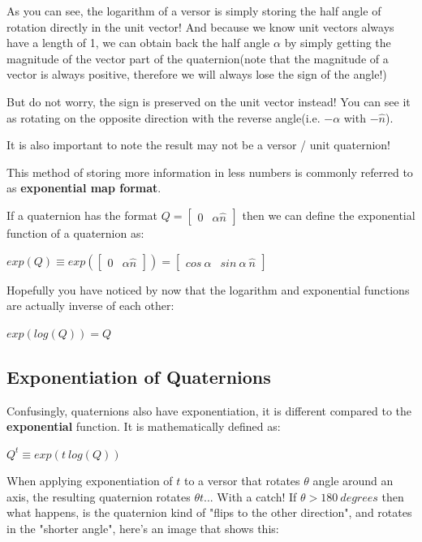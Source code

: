 As you can see, the logarithm of a versor is simply storing the half angle of rotation directly in the unit vector!
And because we know unit vectors always have a length of 1, we can obtain back the half angle $\alpha$
by simply getting the magnitude of the vector part of the quaternion(note that the magnitude
of a vector is always positive, therefore we will always lose the sign of the angle!)

But do not worry, the sign is preserved on the unit vector instead! You can see it as rotating on the opposite direction
with the reverse angle(i.e. $-\alpha$ with $-\hat{n}$).

It is also important to note the result may not be a versor / unit quaternion!

This method of storing more information in less numbers is commonly referred to as \textbf{exponential map format}.

\tgap
If a quaternion has the format $Q = \begin{bmatrix}0 & \alpha\hat{n}\end{bmatrix}$
then we can define the exponential function of a quaternion as:

\begin{center}
    $exp(Q) \equiv exp(\begin{bmatrix}0 & \alpha\hat{n}\end{bmatrix}) = \begin{bmatrix}cos~\alpha & sin~\alpha~\hat{n}\end{bmatrix}$
\end{center}

Hopefully you have noticed by now that the logarithm and exponential functions are actually inverse of each other:

\begin{center}
    $exp(log(Q)) = Q$
\end{center}

\sgap
\subsection{Exponentiation of Quaternions}
Confusingly, quaternions also have exponentiation, it is different compared to the \textbf{exponential} function. It is mathematically defined as:
\begin{center}
    $Q^t \equiv exp(t~log(Q))$
\end{center}

When applying exponentiation of $t$ to a versor that rotates $\theta$ angle around an axis, the resulting quaternion rotates
$\theta t$... With a catch! If $\theta > 180~degrees$ then what happens, is the quaternion kind of "flips to the other direction",
and rotates in the "shorter angle", here's an image that shows this:

